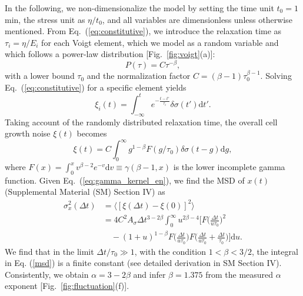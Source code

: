 \documentclass[aps, prl, twocolumn, longbibliography, linenumbers, superscriptaddress]{revtex4-2}
\begin{document}
In the following, we non-dimensionalize the model by setting the time unit $t_0=1$ min, the stress unit as $\eta/t_0$, and all variables are dimensionless unless otherwise mentioned. From Eq.~(\ref{eq:constitutive}), we introduce the relaxation time as $\tau_i = \eta/E_i$ for each Voigt element, which we model as a random variable and which follows a power-law distribution [Fig.~\ref{fig:voigt}(a)]:
\begin{equation}
	P(\tau)=C\tau^{-\beta},
	\label{eq:power-law-P-tau}
\end{equation}
with a lower bound $\tau_0$ and the normalization factor $C=(\beta-1)\tau_0^{\beta-1}$. Solving Eq.~(\ref{eq:constitutive}) for a specific element yields
\begin{equation}
	 \xi_i(t) = \int_{-\infty}^{t} e^{-\frac{t-t'}{\tau_i}} \delta \sigma(t') \mathrm{d}t'.
	\label{eq:gamma_tau_integral_en}
\end{equation}
Taking account of the randomly distributed relaxation time, the overall cell growth noise $\xi(t)$ becomes
\begin{equation}
	\xi(t)  = C \int_{0}^{\infty} g^{1-\beta} F(g/\tau_0) \delta \sigma(t-g) \mathrm{d}g,
	\label{eq:gamma_kernel_en}
\end{equation}
where $F(x)=\int_0^{x} v^{\beta-2} e^{-v}\mathrm{d}v \equiv \gamma(\beta-1, x)$ is the lower incomplete gamma function. Given Eq.~(\ref{eq:gamma_kernel_en}), we find the MSD of $x(t)$ (Supplemental Material (SM) Section IV) as
\begin{equation}
	\begin{aligned} 
		 \sigma_x^2(\Delta t) &= \langle [\xi(\Delta t)-\xi(0)]^2\rangle \\
		&= 4C^2 A_{\sigma} \Delta t^{3-2\beta} \int_{0}^{\infty} u^{2\beta -4}\Big[F\Big(\frac{\Delta t}{u\tau_0}\Big)^2\\
		&\quad - (1+u)^{1-\beta} F\Big(\frac{\Delta t}{u\tau_0}\Big) F\Big(\frac{\Delta t}{u\tau_0}+\frac{\Delta t}{\tau_0}\Big) \Big] \mathrm{d}u.
	\end{aligned}\label{msd}
\end{equation}
We find that in the limit $\Delta t/\tau_0 \gg 1$, with the condition $1<\beta <3/2$, the integral in Eq. (\ref{msd}) is a finite constant (see detailed derivation in SM Section IV). Consistently, we obtain $\alpha = 3 - 2\beta$ and infer $\beta= 1.375$ from the measured $\alpha$ exponent [Fig.~\ref{fig:fluctuation}(f)].
\end{document}
